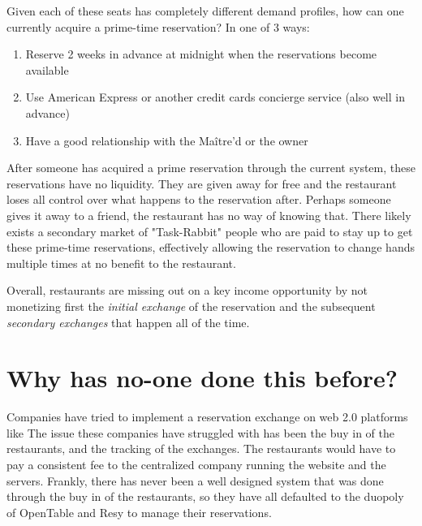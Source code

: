 \documentclass{article}
\begin{document}
	\hspace{1cm}Given each of these seats has completely different demand profiles, how can one currently acquire a prime-time reservation?  In one of 3 ways:
	\begin{center}
	\begin{enumerate}[label=\textbf{\Roman*}.]
		\item Reserve 2 weeks in advance at midnight when the reservations become available
		\item Use American Express or another credit cards concierge service (also well in advance)        
		\item Have a good relationship with the Maître'd or the owner
	\end{enumerate}
	\end{center}
	\hspace{1cm}After someone has acquired a prime reservation through the current system, these reservations have no liquidity.  They are given away for free and the restaurant loses all control over what happens to the reservation after.  Perhaps someone gives it away to a friend, the restaurant has no way of knowing that.  There likely exists a secondary market of "Task-Rabbit" people who are paid to stay up to get these prime-time reservations, effectively allowing the reservation to change hands multiple times at no benefit to the restaurant. %
	
	\hspace{1cm} Overall, restaurants are missing out on a key income opportunity by not monetizing first the \textit{initial exchange} of the reservation and the subsequent \textit{secondary exchanges} that happen all of the time.
	\newpage
	\section{Why has no-one done this before?}
	\hspace{1cm} Companies have tried to implement a reservation exchange on web 2.0 platforms like %
	The issue these companies have struggled with has been the buy in of the restaurants, and the tracking of the exchanges.  The restaurants would have to pay a consistent fee to the centralized company running the website and the servers.  Frankly, there has never been a well designed system that was done through the buy in of the restaurants, so they have all defaulted to the duopoly of OpenTable and Resy to manage their reservations.  
\end{document}
